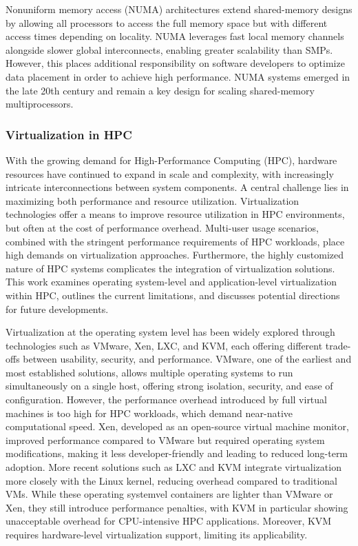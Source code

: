 Nonuniform memory access (NUMA) architectures extend shared-memory designs by allowing all processors to access the full memory space but with different access times depending on locality. NUMA leverages fast local memory channels alongside slower global interconnects, enabling greater scalability than SMPs. However, this places additional responsibility on software developers to optimize data placement in order to achieve high performance. NUMA systems emerged in the late 20th century and remain a key design for scaling shared-memory multiprocessors.


\subsubsection{Virtualization in HPC}
\label{sec:background_hpc_virtualization}
With the growing demand for High-Performance Computing (HPC), hardware resources have continued to expand in scale and complexity, with increasingly intricate interconnections between system components. A central challenge lies in maximizing both performance and resource utilization. Virtualization technologies offer a means to improve resource utilization in HPC environments, but often at the cost of performance overhead. Multi-user usage scenarios, combined with the stringent performance requirements of HPC workloads, place high demands on virtualization approaches. Furthermore, the highly customized nature of HPC systems complicates the integration of virtualization solutions. This work examines operating system-level and application-level virtualization within HPC, outlines the current limitations, and discusses potential directions for future developments.

Virtualization at the operating system level has been widely explored through technologies such as VMware, Xen, LXC, and KVM, each offering different trade-offs between usability, security, and performance. VMware, one of the earliest and most established solutions, allows multiple operating systems to run simultaneously on a single host, offering strong isolation, security, and ease of configuration. However, the performance overhead introduced by full virtual machines is too high for HPC workloads, which demand near-native computational speed. Xen, developed as an open-source virtual machine monitor, improved performance compared to VMware but required operating system modifications, making it less developer-friendly and leading to reduced long-term adoption. More recent solutions such as LXC and KVM integrate virtualization more closely with the Linux kernel, reducing overhead compared to traditional VMs. While these operating systemvel containers are lighter than VMware or Xen, they still introduce performance penalties, with KVM in particular showing unacceptable overhead for CPU-intensive HPC applications. Moreover, KVM requires hardware-level virtualization support, limiting its applicability.

